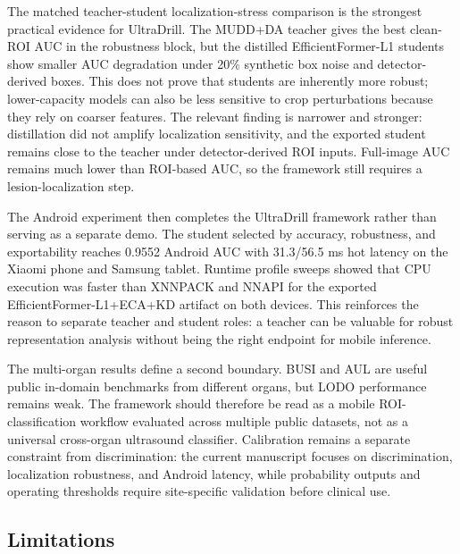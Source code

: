 \documentclass[preprint,12pt]{elsarticle}
\begin{document}
The matched teacher-student localization-stress comparison is the strongest practical evidence for UltraDrill. The MUDD+DA teacher gives the best clean-ROI AUC in the robustness block, but the distilled EfficientFormer-L1 students show smaller AUC degradation under 20\% synthetic box noise and detector-derived boxes. This does not prove that students are inherently more robust; lower-capacity models can also be less sensitive to crop perturbations because they rely on coarser features. The relevant finding is narrower and stronger: distillation did not amplify localization sensitivity, and the exported student remains close to the teacher under detector-derived ROI inputs. Full-image AUC remains much lower than ROI-based AUC, so the framework still requires a lesion-localization step.

The Android experiment then completes the UltraDrill framework rather than serving as a separate demo. The student selected by accuracy, robustness, and exportability reaches 0.9552 Android AUC with 31.3/56.5 ms hot latency on the Xiaomi phone and Samsung tablet. Runtime profile sweeps showed that CPU execution was faster than XNNPACK and NNAPI for the exported EfficientFormer-L1+ECA+KD artifact on both devices. This reinforces the reason to separate teacher and student roles: a teacher can be valuable for robust representation analysis without being the right endpoint for mobile inference.

The multi-organ results define a second boundary. BUSI and AUL are useful public in-domain benchmarks from different organs, but LODO performance remains weak. The framework should therefore be read as a mobile ROI-classification workflow evaluated across multiple public datasets, not as a universal cross-organ ultrasound classifier. Calibration remains a separate constraint from discrimination: the current manuscript focuses on discrimination, localization robustness, and Android latency, while probability outputs and operating thresholds require site-specific validation before clinical use.

\subsection*{Limitations}
\end{document}
